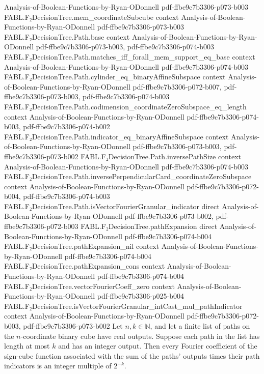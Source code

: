 \begin{theorem}
  {Analysis-of-Boolean-Functions-by-Ryan-ODonnell}
  {pdf-ffbe9c7b3306-p073-b003}
\proofstep
  {FABL.F₂DecisionTree.mem_coordinateSubcube}
  {context}
  {Analysis-of-Boolean-Functions-by-Ryan-ODonnell}
  {pdf-ffbe9c7b3306-p073-b003}
\proofstep
  {FABL.F₂DecisionTree.Path.base}
  {context}
  {Analysis-of-Boolean-Functions-by-Ryan-ODonnell}
  {pdf-ffbe9c7b3306-p073-b003,
    pdf-ffbe9c7b3306-p074-b003}
\proofstep
  {FABL.F₂DecisionTree.Path.matches_iff_forall_mem_support_eq_base}
  {context}
  {Analysis-of-Boolean-Functions-by-Ryan-ODonnell}
  {pdf-ffbe9c7b3306-p074-b003}
\proofstep
  {FABL.F₂DecisionTree.Path.cylinder_eq_binaryAffineSubspace}
  {context}
  {Analysis-of-Boolean-Functions-by-Ryan-ODonnell}
  {pdf-ffbe9c7b3306-p072-b007,
    pdf-ffbe9c7b3306-p073-b003,
    pdf-ffbe9c7b3306-p074-b003}
\proofstep
  {FABL.F₂DecisionTree.Path.codimension_coordinateZeroSubspace_eq_length}
  {context}
  {Analysis-of-Boolean-Functions-by-Ryan-ODonnell}
  {pdf-ffbe9c7b3306-p074-b003,
    pdf-ffbe9c7b3306-p074-b002}
\proofstep
  {FABL.F₂DecisionTree.Path.indicator_eq_binaryAffineSubspace}
  {context}
  {Analysis-of-Boolean-Functions-by-Ryan-ODonnell}
  {pdf-ffbe9c7b3306-p073-b003,
    pdf-ffbe9c7b3306-p073-b002}
\proofstep
  {FABL.F₂DecisionTree.Path.inversePathSize}
  {context}
  {Analysis-of-Boolean-Functions-by-Ryan-ODonnell}
  {pdf-ffbe9c7b3306-p074-b003}
\proofstep
  {FABL.F₂DecisionTree.Path.inversePerpendicularCard_coordinateZeroSubspace}
  {context}
  {Analysis-of-Boolean-Functions-by-Ryan-ODonnell}
  {pdf-ffbe9c7b3306-p072-b004,
    pdf-ffbe9c7b3306-p074-b003}
\proofstep
  {FABL.F₂DecisionTree.Path.isVectorFourierGranular_indicator}
  {direct}
  {Analysis-of-Boolean-Functions-by-Ryan-ODonnell}
  {pdf-ffbe9c7b3306-p073-b002,
    pdf-ffbe9c7b3306-p072-b003}
\proofstep
  {FABL.F₂DecisionTree.pathExpansion}
  {direct}
  {Analysis-of-Boolean-Functions-by-Ryan-ODonnell}
  {pdf-ffbe9c7b3306-p074-b004}
\proofstep
  {FABL.F₂DecisionTree.pathExpansion_nil}
  {context}
  {Analysis-of-Boolean-Functions-by-Ryan-ODonnell}
  {pdf-ffbe9c7b3306-p074-b004}
\proofstep
  {FABL.F₂DecisionTree.pathExpansion_cons}
  {context}
  {Analysis-of-Boolean-Functions-by-Ryan-ODonnell}
  {pdf-ffbe9c7b3306-p074-b004}
\proofstep
  {FABL.F₂DecisionTree.vectorFourierCoeff_zero}
  {context}
  {Analysis-of-Boolean-Functions-by-Ryan-ODonnell}
  {pdf-ffbe9c7b3306-p025-b004}
\proofstep
  {FABL.F₂DecisionTree.isVectorFourierGranular_intCast_mul_pathIndicator}
  {context}
  {Analysis-of-Boolean-Functions-by-Ryan-ODonnell}
  {pdf-ffbe9c7b3306-p072-b003,
    pdf-ffbe9c7b3306-p073-b002}
Let $n,k\in\mathbb N$, and let a finite list of paths on the $n$-coordinate binary cube
have real outputs. Suppose each path in the list has length at most $k$ and has an
integer output. Then every Fourier coefficient of the sign-cube function associated with
the sum of the paths' outputs times their path indicators is an integer multiple of
$2^{-k}$.
\end{theorem}

